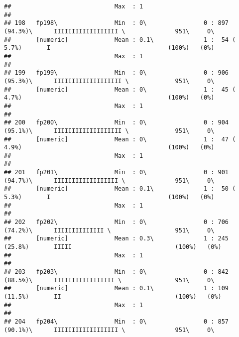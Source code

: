 \documentclass[]{article}
\begin{document}
\begin{verbatim}
##                             Max  : 1                                                                                           
## 
## 198   fp198\                Min  : 0\                0 : 897 (94.3%)\      IIIIIIIIIIIIIIIIII \              951\     0\       
##       [numeric]             Mean : 0.1\              1 :  54 ( 5.7%)       I                                 (100%)   (0%)     
##                             Max  : 1                                                                                           
## 
## 199   fp199\                Min  : 0\                0 : 906 (95.3%)\      IIIIIIIIIIIIIIIIIII \             951\     0\       
##       [numeric]             Mean : 0\                1 :  45 ( 4.7%)                                         (100%)   (0%)     
##                             Max  : 1                                                                                           
## 
## 200   fp200\                Min  : 0\                0 : 904 (95.1%)\      IIIIIIIIIIIIIIIIIII \             951\     0\       
##       [numeric]             Mean : 0\                1 :  47 ( 4.9%)                                         (100%)   (0%)     
##                             Max  : 1                                                                                           
## 
## 201   fp201\                Min  : 0\                0 : 901 (94.7%)\      IIIIIIIIIIIIIIIIII \              951\     0\       
##       [numeric]             Mean : 0.1\              1 :  50 ( 5.3%)       I                                 (100%)   (0%)     
##                             Max  : 1                                                                                           
## 
## 202   fp202\                Min  : 0\                0 : 706 (74.2%)\      IIIIIIIIIIIIII \                  951\     0\       
##       [numeric]             Mean : 0.3\              1 : 245 (25.8%)       IIIII                             (100%)   (0%)     
##                             Max  : 1                                                                                           
## 
## 203   fp203\                Min  : 0\                0 : 842 (88.5%)\      IIIIIIIIIIIIIIIII \               951\     0\       
##       [numeric]             Mean : 0.1\              1 : 109 (11.5%)       II                                (100%)   (0%)     
##                             Max  : 1                                                                                           
## 
## 204   fp204\                Min  : 0\                0 : 857 (90.1%)\      IIIIIIIIIIIIIIIIII \              951\     0\       

\end{verbatim}
\end{document}
